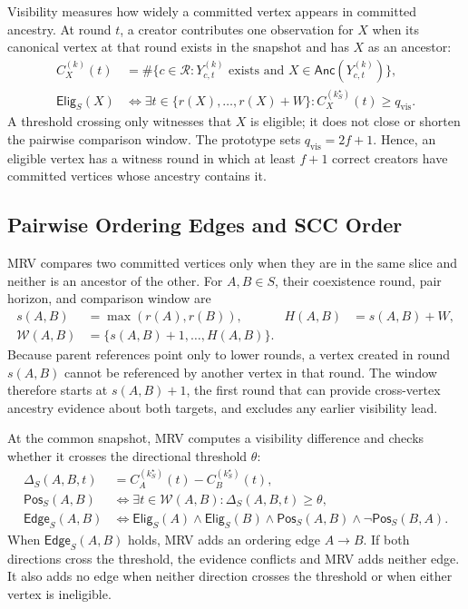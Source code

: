 Visibility measures how widely a committed vertex appears in committed ancestry. At round $t$, a creator contributes one observation for $X$ when its canonical vertex at that round exists in the snapshot and has $X$ as an ancestor:
\[
\begin{aligned}
C_X^{(k)}(t)
&=
\#\{c\in\mathcal{R}:
Y^{(k)}_{c,t}\text{ exists and }
X\in\mathsf{Anc}(Y^{(k)}_{c,t})\},\\
\mathsf{Elig}_S(X)
&\iff
\exists t\in\{r(X),\ldots,r(X)+W\}:
C_X^{(k^\star_S)}(t)\geq q_{\mathrm{vis}} .
\end{aligned}
\]
A threshold crossing only witnesses that $X$ is eligible; it does not close or shorten the pairwise comparison window. The prototype sets $q_{\mathrm{vis}}=2f+1$. Hence, an eligible vertex has a witness round in which at least $f+1$ correct creators have committed vertices whose ancestry contains it.

\subsection{Pairwise Ordering Edges and SCC Order}
\label{sec:structural_property}

MRV compares two committed vertices only when they are in the same slice and neither is an ancestor of the other. For $A,B\in S$, their coexistence round, pair horizon, and comparison window are
\[
\begin{aligned}
s(A,B) &= \max(r(A),r(B)), &
H(A,B) &= s(A,B)+W,\\
\mathcal{W}(A,B) &= \{s(A,B)+1,\ldots,H(A,B)\}.
\end{aligned}
\]
Because parent references point only to lower rounds, a vertex created in round $s(A,B)$ cannot be referenced by another vertex in that round. The window therefore starts at $s(A,B)+1$, the first round that can provide cross-vertex ancestry evidence about both targets, and excludes any earlier visibility lead.

At the common snapshot, MRV computes a visibility difference and checks whether it crosses the directional threshold $\theta$:
\[
\begin{aligned}
\Delta_S(A,B,t)
&=C_A^{(k^\star_S)}(t)-C_B^{(k^\star_S)}(t),\\
\mathsf{Pos}_S(A,B)
&\iff
\exists t\in\mathcal{W}(A,B):
\Delta_S(A,B,t)\geq\theta,\\
\mathsf{Edge}_S(A,B)
&\iff
\mathsf{Elig}_S(A)\land\mathsf{Elig}_S(B)
\land\mathsf{Pos}_S(A,B)
\land\neg\mathsf{Pos}_S(B,A).
\end{aligned}
\]
When $\mathsf{Edge}_S(A,B)$ holds, MRV adds an ordering edge $A\to B$. If both directions cross the threshold, the evidence conflicts and MRV adds neither edge. It also adds no edge when neither direction crosses the threshold or when either vertex is ineligible.


